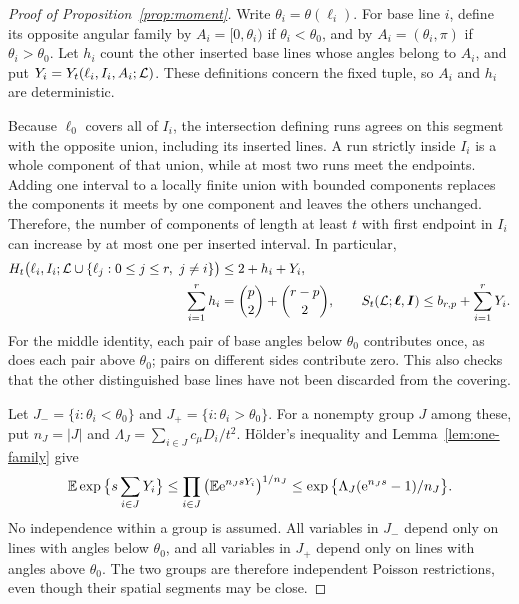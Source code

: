 \documentclass[11pt,letterpaper]{article}
\begin{document}
\begin{proof}[Proof of Proposition~\ref{prop:moment}]
Write $\theta_i=\theta(\ell_i)$. For base line $i$, define its opposite angular family by $A_i=[0,\theta_i)$ if $\theta_i<\theta_0$, and by $A_i=(\theta_i,\pi)$ if $\theta_i>\theta_0$. Let $h_i$ count the other inserted base lines whose angles belong to $A_i$, and put $Y_i=Y_t(\ell_i,I_i,A_i;\mathcal L)$. These definitions concern the fixed tuple, so $A_i$ and $h_i$ are deterministic.

Because $\ell_0$ covers all of $I_i$, the intersection defining runs agrees on this segment with the opposite union, including its inserted lines. A run strictly inside $I_i$ is a whole component of that union, while at most two runs meet the endpoints. Adding one interval to a locally finite union with bounded components replaces the components it meets by one component and leaves the others unchanged. Therefore, the number of components of length at least $t$ with first endpoint in $I_i$ can increase by at most one per inserted interval. In particular,
\begin{equation}\label{eq:insertion}
\begin{aligned}
 H_t\big(\ell_i,I_i;\mathcal L\cup\{\ell_j:0\le j\le r,\ j\ne i\}\big)&\le2+h_i+Y_i,\\
 \sum_{i=1}^rh_i&=\binom p2+\binom{r-p}2,\qquad
 S_t(\mathcal L;\boldsymbol\ell,\boldsymbol I)\le b_{r,p}+\sum_{i=1}^rY_i.
\end{aligned}
\end{equation}
For the middle identity, each pair of base angles below $\theta_0$ contributes once, as does each pair above $\theta_0$; pairs on different sides contribute zero. This also checks that the other distinguished base lines have not been discarded from the covering.

Let $J_- =\{i:\theta_i<\theta_0\}$ and $J_+=\{i:\theta_i>\theta_0\}$. For a nonempty group $J$ among these, put $n_J=|J|$ and $\Lambda_J=\sum_{i\in J}c_\mu D_i/t^2$. H\"older's inequality and Lemma~\ref{lem:one-family} give
\begin{equation}\label{eq:holder}
 \mathbb E\exp\big\{s\sum_{i\in J}Y_i\big\}
 \le\prod_{i\in J}\big(\mathbb E\mathrm{e}^{n_JsY_i}\big)^{1/n_J}
 \le\exp\big\{\Lambda_J(\mathrm{e}^{n_Js}-1)/n_J\big\}.
\end{equation}
No independence within a group is assumed. All variables in $J_-$ depend only on lines with angles below $\theta_0$, and all variables in $J_+$ depend only on lines with angles above $\theta_0$. The two groups are therefore independent Poisson restrictions, even though their spatial segments may be close.


\end{proof}
\end{document}
